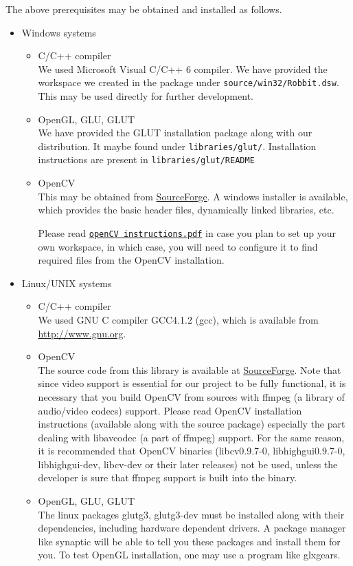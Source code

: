 \documentclass[10pt,a4paper]{article}
\newcommand{\ns}{\vspace{6pt}\noindent}
\begin{document}
\ns
The above prerequisites may be obtained and installed as follows.
\begin{itemize}
\item Windows systems
	\begin{itemize}
	\item C/C++ compiler \\
We used Microsoft Visual C/C++ 6 compiler. We have provided the workspace we created in the package under {\tt source/win32/Robbit.dsw}. This may be used directly for further development.
	\item OpenGL, GLU, GLUT \\
We have provided the GLUT installation package along with our distribution. It maybe found under {\tt libra\-ries/glut/}. Installation instructions are present in {\tt libraries/glut/README}
	\item OpenCV \\
	This may be obtained from \href{http://sourceforge.net/projects/opencvlibrary/}{SourceForge\textsuperscript{\textregistered}}. A windows installer is available, which provides the basic header files, dynamically linked libraries, etc.
		
	\ns
	Please read \href{openCV instructions.pdf}{\texttt{openCV instructions.pdf}} in case you plan to set up your own workspace, in which case, you will need to configure it to find required files from the OpenCV installation.
	\end{itemize}
\item Linux/UNIX systems
	\begin{itemize}
	\item C/C++ compiler \\
	We used GNU C compiler GCC4.1.2 ({\sc gcc}), which is available from \href{http://www.gnu.org}{http://www.gnu.org}.
	\item OpenCV \\
The source code from this library is available at \href{http://sourceforge.net/projects/opencvlibrary/}{SourceForge\textsuperscript{\textregistered}}. Note that since video support is essential for our project to be fully functional, it is necessary that you build OpenCV from sources with {\sc ffmpeg} (a library of audio/video codecs) support. Please read OpenCV installation instructions (available along with the source package) especially the part dealing with libavcodec (a part of {\sc ffmpeg}) support. For the same reason, it is recommended that OpenCV binaries ({\sc libcv0.9.7-0}, {\sc libhighgui0.9.7-0}, {\sc libhighgui-dev}, {\sc libcv-dev} or their later releases) not be used, unless the developer is sure that {\sc ffmpeg} support is built into the binary.
	\item OpenGL, GLU, GLUT \\
The linux packages {\sc glutg3}, {\sc glutg3-dev} must be installed along with their dependencies, including hardware dependent drivers. A package manager like {\sc synaptic} will be able to tell you these packages and install them for you. To test OpenGL installation, one may use a program like {\sc glxgears}.
	\end{itemize}
\end{itemize}
\end{document}
